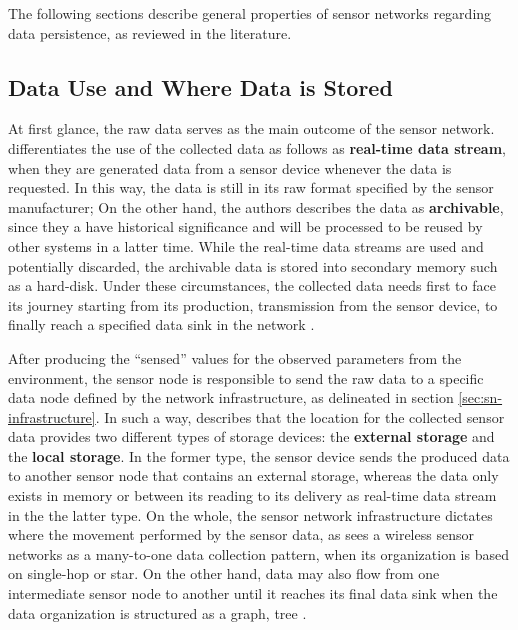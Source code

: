 The following sections describe general properties of sensor networks regarding
data persistence, as reviewed in the literature.

\subsection{Data Use and Where Data is Stored}
\label{sec:sn-data-purpose}
\label{sec:sn-storage-locations}

At first glance, the raw data serves as the main outcome of the sensor network.
\cite{sn-provenance} differentiates the use of the collected data as follows as 
\textbf{real-time data stream}, when they are generated data from a sensor
device whenever the data is requested. In this way, the data is still in its raw
format specified by the sensor manufacturer; On the other hand, the authors
describes the data as \textbf{archivable}, since they a have historical
significance and will be processed to be reused by other systems in a latter
time. While the real-time data streams are used and potentially discarded, the
archivable data is stored into secondary memory such as a hard-disk. Under
these circumstances, the collected data needs first to face its journey
starting from its production, transmission from the sensor device, to finally
reach a specified data sink in the network \cite{sn-storage01, sn-storage02,
sn-storage03}.

After producing the ``sensed'' values for the observed parameters from the
environment, the sensor node is responsible to send the raw data to a specific
data node defined by the network infrastructure, as delineated in section
\ref{sec:sn-infrastructure}. In such a way, \cite{sn-storage03}
describes that the location for the collected sensor data provides two
different types of storage devices: the \textbf{external storage} and the
\textbf{local storage}. In the former type, the sensor device sends the
produced data to another sensor node that contains an external storage, whereas
the data only exists in memory or between its reading to its delivery as
real-time data stream in the the latter type. On the whole, the sensor network
infrastructure dictates where the movement performed by the sensor data, as
\cite{sn-storage02} sees a wireless sensor networks as a many-to-one data
collection pattern, when its organization is based on single-hop or star. On
the other hand, data may also flow from one intermediate sensor node to another
until it reaches its final data sink when the data organization is structured
as a graph, tree \cite{sn-storage01, sn-storage03}.

